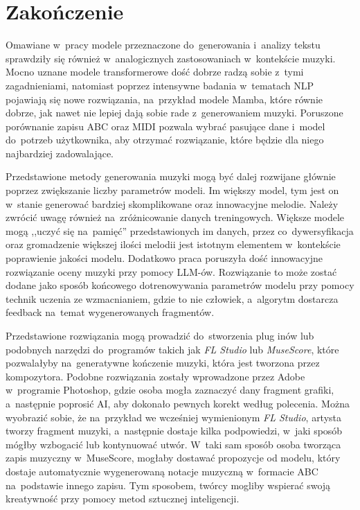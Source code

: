 \documentclass[data-science]{agh-wi} %
\begin{document}
\chapter{Zakończenie}

Omawiane w~pracy modele przeznaczone do~generowania i~analizy tekstu sprawdziły się również w~analogicznych zastosowaniach w~kontekście muzyki. Mocno uznane modele transformerowe dość dobrze radzą sobie z~tymi zagadnieniami, natomiast poprzez intensywne badania w~tematach NLP pojawiają się nowe rozwiązania, na~przykład modele Mamba, które równie dobrze, jak nawet nie lepiej dają sobie rade z~generowaniem muzyki. Poruszone porównanie zapisu ABC oraz MIDI pozwala wybrać pasujące dane i~model do~potrzeb użytkownika, aby otrzymać rozwiązanie, które będzie dla niego najbardziej zadowalające.

Przedstawione metody generowania muzyki mogą być dalej rozwijane głównie poprzez zwiększanie liczby parametrów modeli. Im większy model, tym jest on w~stanie generować bardziej skomplikowane oraz innowacyjne melodie. Należy zwrócić uwagę również na~zróżnicowanie danych treningowych. Większe modele mogą ,,uczyć się na~pamięć'' przedstawionych im danych, przez co~dywersyfikacja oraz gromadzenie większej ilości melodii jest istotnym elementem w~kontekście poprawienie jakości modelu. Dodatkowo praca poruszyła dość innowacyjne rozwiązanie oceny muzyki przy pomocy LLM-ów. Rozwiązanie to może zostać dodane jako sposób końcowego dotrenowywania parametrów modelu przy pomocy technik uczenia ze wzmacnianiem, gdzie to nie człowiek, a~algorytm dostarcza feedback na~temat wygenerowanych fragmentów.

Przedstawione rozwiązania mogą prowadzić do~stworzenia plug inów lub podobnych narzędzi do~programów takich jak \textit{FL Studio} lub \textit{MuseScore}, które pozwalałyby na~generatywne kończenie muzyki, która jest tworzona przez kompozytora. Podobne rozwiązania zostały wprowadzone przez Adobe w~programie Photoshop, gdzie osoba mogła zaznaczyć dany fragment grafiki, a~następnie poprosić AI, aby dokonało pewnych korekt według polecenia. Można wyobrazić sobie, że na~przykład we wcześniej wymienionym \textit{FL Studio}, artysta tworzy fragment muzyki, a~następnie dostaje kilka podpowiedzi, w~jaki sposób mógłby wzbogacić lub kontynuować utwór. W~taki sam sposób osoba tworząca zapis muzyczny w~MuseScore, mogłaby dostawać propozycje od modelu, który dostaje automatycznie wygenerowaną notacje muzyczną w~formacie ABC na~podstawie innego zapisu. Tym sposobem, twórcy mogliby wspierać swoją kreatywność przy pomocy metod sztucznej inteligencji.
\end{document}
